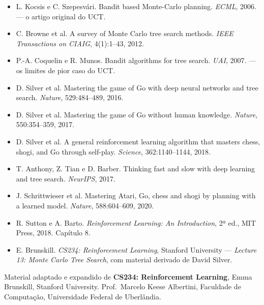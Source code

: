 \documentclass[a4paper, 11pt]{article}
\begin{document}
{\small
\begin{itemize}
  \item L. Kocsis e C. Szepesvári. Bandit based Monte-Carlo planning.
        \emph{ECML}, 2006. --- o artigo original do UCT.
  \item C. Browne et al. A survey of Monte Carlo tree search methods.
        \emph{IEEE Transactions on CIAIG}, 4(1):1--43, 2012.
  \item P.-A. Coquelin e R. Munos. Bandit algorithms for tree search.
        \emph{UAI}, 2007. --- os limites de pior caso do UCT.
  \item D. Silver et al. Mastering the game of Go with deep neural networks and
        tree search. \emph{Nature}, 529:484--489, 2016.
  \item D. Silver et al. Mastering the game of Go without human knowledge.
        \emph{Nature}, 550:354--359, 2017.
  \item D. Silver et al. A general reinforcement learning algorithm that masters
        chess, shogi, and Go through self-play. \emph{Science},
        362:1140--1144, 2018.
  \item T. Anthony, Z. Tian e D. Barber. Thinking fast and slow with deep
        learning and tree search. \emph{NeurIPS}, 2017.
  \item J. Schrittwieser et al. Mastering Atari, Go, chess and shogi by planning
        with a learned model. \emph{Nature}, 588:604--609, 2020.
  \item R. Sutton e A. Barto. \emph{Reinforcement Learning: An Introduction},
        2ª ed., MIT Press, 2018. Capítulo 8.
  \item E. Brunskill. \emph{CS234: Reinforcement Learning}, Stanford University
        --- \emph{Lecture 13: Monte Carlo Tree Search}, com material derivado de
        David Silver.
\end{itemize}}

\vfill
{\footnotesize\color{rlCinza}
Material adaptado e expandido de \textbf{CS234: Reinforcement Learning},
Emma Brunskill, Stanford University. Prof.\ Marcelo Keese Albertini,
Faculdade de Computação, Universidade Federal de Uberlândia.}
\end{document}
